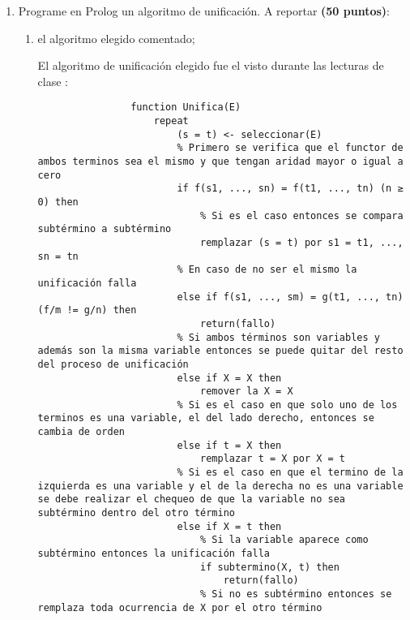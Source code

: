 \begin{enumerate}
    \item Programe en Prolog un algoritmo de unificación. A reportar \textbf{(50 puntos)}:
    \begin{enumerate}
        \item el algoritmo elegido comentado;
        \begin{solution}
            El algoritmo de unificación elegido fue el visto durante las lecturas de  clase \cite{guerra2022pia}:
            \begin{verbatim}
                function Unifica(E)
                    repeat
                        (s = t) <- seleccionar(E)
                        % Primero se verifica que el functor de ambos terminos sea el mismo y que tengan aridad mayor o igual a cero
                        if f(s1, ..., sn) = f(t1, ..., tn) (n ≥ 0) then
                            % Si es el caso entonces se compara subtérmino a subtérmino
                            remplazar (s = t) por s1 = t1, ..., sn = tn
                        % En caso de no ser el mismo la unificación falla
                        else if f(s1, ..., sm) = g(t1, ..., tn) (f/m != g/n) then
                            return(fallo)
                        % Si ambos términos son variables y además son la misma variable entonces se puede quitar del resto del proceso de unificación
                        else if X = X then 
                            remover la X = X
                        % Si es el caso en que solo uno de los terminos es una variable, el del lado derecho, entonces se cambia de orden
                        else if t = X then
                            remplazar t = X por X = t
                        % Si es el caso en que el termino de la izquierda es una variable y el de la derecha no es una variable se debe realizar el chequeo de que la variable no sea subtérmino dentro del otro término
                        else if X = t then
                            % Si la variable aparece como subtérmino entonces la unificación falla
                            if subtermino(X, t) then
                                return(fallo)
                            % Si no es subtérmino entonces se remplaza toda ocurrencia de X por el otro término

\end{verbatim}
\end{solution}
\end{enumerate}
\end{enumerate}

